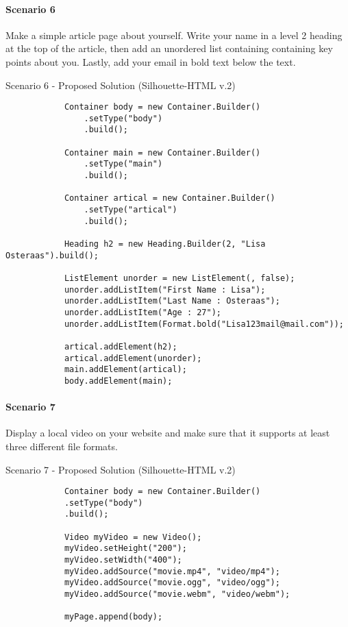 \documentclass[12pt]{article}
\begin{document}
        \paragraph{Scenario 6}
        Make a simple article page about yourself. Write your name in a level 2 heading at the top of the article, then add an unordered list containing containing key points about you. Lastly, add your email in bold text below the text.

        \begin{shaded}
            Scenario 6 - Proposed Solution (Silhouette-HTML v.2)
            \begin{lstlisting}
            Container body = new Container.Builder()
                .setType("body")
                .build();

            Container main = new Container.Builder()
                .setType("main")
                .build();

            Container artical = new Container.Builder()
                .setType("artical")
                .build();

            Heading h2 = new Heading.Builder(2, "Lisa Osteraas").build();
                                        
            ListElement unorder = new ListElement(, false);
            unorder.addListItem("First Name : Lisa");
            unorder.addListItem("Last Name : Osteraas");
            unorder.addListItem("Age : 27");
            unorder.addListItem(Format.bold("Lisa123mail@mail.com"));

            artical.addElement(h2);
            artical.addElement(unorder);
            main.addElement(artical);
            body.addElement(main);
            \end{lstlisting}
        \end{shaded}

        \paragraph{Scenario 7}
        Display a local video on your website and make sure that it supports at least three different file formats.

        \begin{shaded}
            Scenario 7 - Proposed Solution (Silhouette-HTML v.2)
            \begin{lstlisting}
            Container body = new Container.Builder()
            .setType("body")
            .build();

            Video myVideo = new Video();
            myVideo.setHeight("200");
            myVideo.setWidth("400");
            myVideo.addSource("movie.mp4", "video/mp4");
            myVideo.addSource("movie.ogg", "video/ogg");
            myVideo.addSource("movie.webm", "video/webm");

            myPage.append(body);
            \end{lstlisting}
        \end{shaded}
\end{document}
